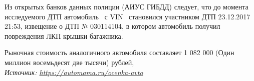 Из открытых банков данных полиции (АИУС ГИБДД) следует, что до момента исследуемого ДТП автомобиль \, с VIN  \, 
становился участником ДТП  23.12.2017  21:53, извещение о ДТП № 030114104, в котором автомобиль получил повреждения ЛКП крышки багажника. %
%
%



Рыночная стоимость аналогичного автомобиля составляет 1 082 000 (Один миллион восемьдесят две тысячи) рублей,\\
\noindent\textit{Источник: \url{https://automama.ru/ocenka-avto}}
\vspace{3mm}
%

